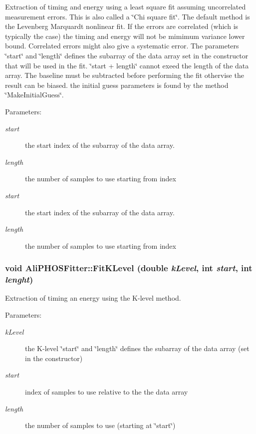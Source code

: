 Extraction of timing and energy using a least square fit assuming uncorrelated measurement errors. This is also called a \char`\"{}Chi square fit\char`\"{}. The default method is the Levenberg Marquardt nonlinear fit. If the errors are correlated (which is typically the case) the timing and energy will not be mimimum variance lower bound. Correlated errors might also give a systematic error. The parameters \char`\"{}start\char`\"{} and \char`\"{}length\char`\"{} defines the subarray of the data array set in the constructor that will be used in the fit. \char`\"{}start + length\char`\"{} cannot exeed the length of the data array. The baseline must be subtracted before performing the fit othervise the result can be biased. the initial guess parameters is found by the method \char`\"{}Make\-Initial\-Guess\char`\"{}. \begin{Desc}
\item[Parameters:]
\begin{description}
\item[{\em start}]the start index of the subarray of the data array. \item[{\em length}]the number of samples to use starting from index \item[{\em start}]the start index of the subarray of the data array. \item[{\em length}]the number of samples to use starting from index \end{description}
\end{Desc}
\subsubsection{\setlength{\rightskip}{0pt plus 5cm}void Ali\-PHOSFitter::Fit\-KLevel (double {\em k\-Level}, int {\em start}, int {\em lenght})}\label{classAliPHOSFitter_a7}


Extraction of timing an energy using the K-level method. \begin{Desc}
\item[Parameters:]
\begin{description}
\item[{\em k\-Level}]the K-level \char`\"{}start\char`\"{} and \char`\"{}length\char`\"{} defines the subarray of the data array (set in the constructor) \item[{\em start}]index of samples to use relative to the the data array \item[{\em length}]the number of samples to use (starting at \char`\"{}start\char`\"{}) \end{description}
\end{Desc}
